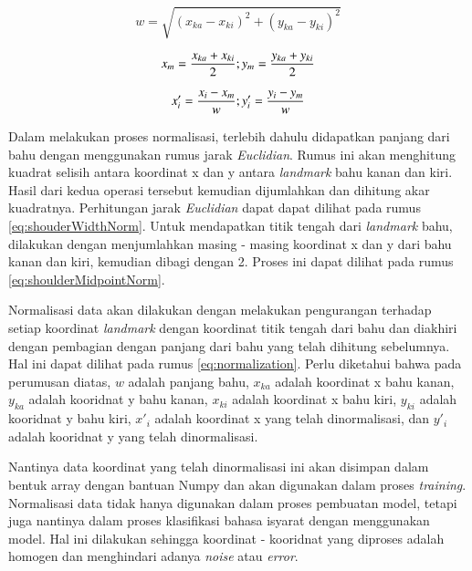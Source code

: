 \begin{equation}
  \label{eq:shouderWidthNorm}
  w = \sqrt{(x_{ka} - x_{ki})^2 + (y_{ka} - y_{ki})^2}
\end{equation}

\begin{equation}
  \label{eq:shoulderMidpointNorm}
  x_m = \frac{x_{ka} + x_{ki}}{2} ; \\
   y_m = \frac{y_{ka} + y_{ki}}{2}
\end{equation}

\begin{equation}
  \label{eq:normalization}
  x'_i = \frac{x_i - x_m}{w} ;  \\
   y'_i = \frac{y_i - y_m}{w}
\end{equation}

Dalam melakukan proses normalisasi, terlebih dahulu didapatkan panjang dari bahu dengan menggunakan rumus jarak \textit{Euclidian}. Rumus ini akan menghitung kuadrat selisih antara koordinat x dan y antara \textit{landmark} bahu kanan dan kiri. Hasil dari kedua operasi tersebut kemudian dijumlahkan dan dihitung akar kuadratnya. Perhitungan jarak \textit{Euclidian} dapat dapat dilihat pada rumus \ref{eq:shouderWidthNorm}. Untuk mendapatkan titik tengah dari \textit{landmark} bahu, dilakukan dengan menjumlahkan masing - masing koordinat x dan y dari bahu kanan dan kiri, kemudian dibagi dengan 2. Proses ini dapat dilihat pada rumus \ref{eq:shoulderMidpointNorm}.

Normalisasi data akan dilakukan dengan melakukan pengurangan terhadap setiap koordinat \textit{landmark} dengan koordinat titik tengah dari bahu dan diakhiri dengan pembagian dengan panjang dari bahu yang telah dihitung sebelumnya. Hal ini dapat dilihat pada rumus \ref{eq:normalization}. Perlu diketahui bahwa pada perumusan diatas, $w$ adalah panjang bahu, $x_{ka}$ adalah koordinat x bahu kanan, $y_{ka}$ adalah kooridnat y bahu kanan, $x_{ki}$ adalah koordinat x bahu kiri, $y_{ki}$ adalah kooridnat y bahu kiri, $x'_i$ adalah koordinat x yang telah dinormalisasi, dan $y'_i$ adalah kooridnat y yang telah dinormalisasi.

Nantinya data koordinat yang telah dinormalisasi ini akan disimpan dalam bentuk array dengan bantuan Numpy dan akan digunakan dalam proses \textit{training}. Normalisasi data tidak hanya digunakan dalam proses pembuatan model, tetapi juga nantinya dalam proses klasifikasi bahasa isyarat dengan menggunakan model. Hal ini dilakukan sehingga koordinat - kooridnat yang diproses adalah homogen dan menghindari adanya \textit{noise} atau \textit{error}.

